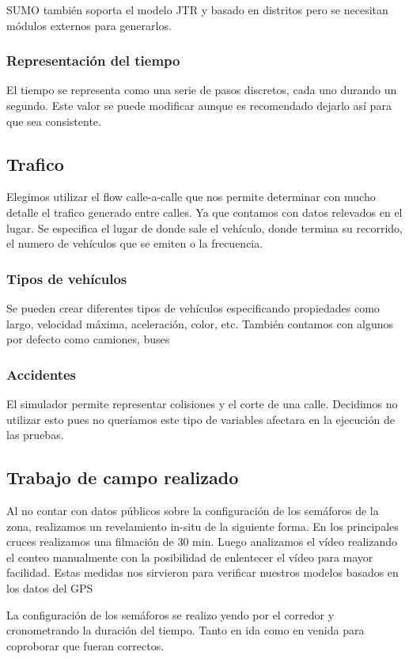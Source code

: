 SUMO también soporta el modelo JTR y basado en distritos pero se necesitan módulos externos para generarlos.

\subsubsection{Representación del tiempo}
El tiempo se representa como una serie de pasos discretos, cada uno durando un segundo. Este valor se puede modificar aunque es recomendado dejarlo así para que sea consistente.

\subsection{Trafico}
Elegimos utilizar el flow calle-a-calle que nos permite determinar con mucho detalle el trafico generado entre calles. Ya que contamos con datos relevados en el lugar. Se especifica el lugar de donde sale el vehículo, donde termina su recorrido, el numero de vehículos que se emiten o la frecuencia.

\subsubsection{Tipos de vehículos}
Se pueden crear diferentes tipos de vehículos especificando propiedades como largo, velocidad máxima,  aceleración, color, etc. También contamos con algunos por defecto como camiones, buses

\subsubsection{Accidentes}
El simulador permite representar colisiones y el corte de una calle. Decidimos no utilizar esto pues no queríamos este tipo de variables afectara en la ejecución de las pruebas.

\subsection{Trabajo de campo realizado}
Al no contar con datos públicos sobre la configuración de los semáforos de la zona, realizamos un revelamiento in-situ de la siguiente forma.
En los principales cruces realizamos una filmación de 30 min. Luego analizamos el vídeo realizando el conteo manualmente con la posibilidad de enlentecer el vídeo para mayor facilidad.
Estas medidas nos sirvieron para verificar nuestros modelos basados en los datos del GPS 

La configuración de los semáforos se realizo yendo por el corredor y cronometrando la duración del tiempo. Tanto en ida como en venida para coproborar que fueran correctos.



